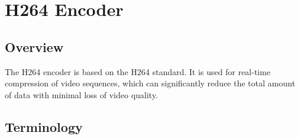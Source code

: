 \documentclass[main\_\_EN.tex]{subfiles}
\begin{document}

\ifglobal
\else
    \listoftodos
    {\let\clearpage\relax \listofdonetodos}
    \tableofcontents
\fi



\hypertarget{h264enc}{}
\chapter{H264 Encoder}\label{mod:h264enc}


\section{Overview}

The H264 encoder is based on the H264 standard. It is used for real-time compression of video sequences, which can significantly reduce the total amount of data with minimal loss of video quality.


\section{Terminology}
\end{document}
